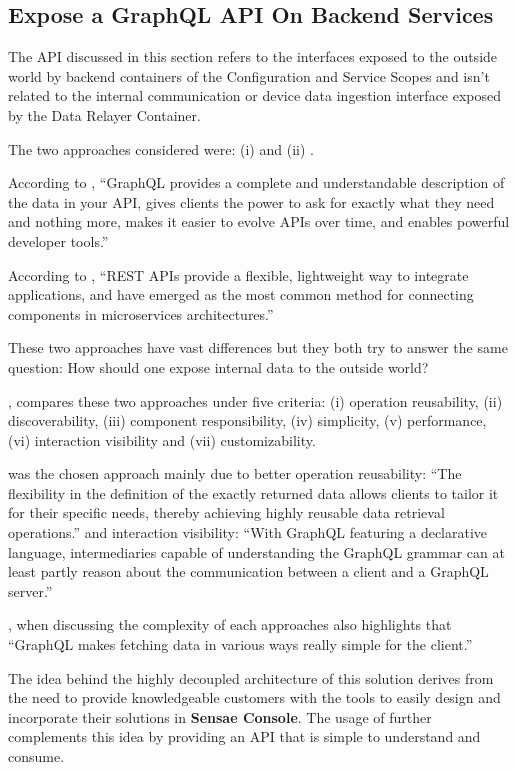 \subsection{Expose a GraphQL API On Backend Services}
\label{subsec:implementation:decisions:graphql}

The \gls{API} discussed in this section refers to the interfaces exposed to the outside world by backend containers of the Configuration and Service Scopes and isn't related to the internal communication or device data ingestion interface exposed by the Data Relayer Container.

The two approaches considered were: (i)  and (ii) .

According to \cite{graphql}, ``GraphQL provides a complete and understandable description of the data in your API, gives clients the power to ask for exactly what they need and nothing more, makes it easier to evolve APIs over time, and enables powerful developer tools.''

According to \cite{rest}, ``REST APIs provide a flexible, lightweight way to integrate applications, and have emerged as the most common method for connecting components in microservices architectures.''
 
These two approaches have vast differences but they both try to answer the same question: How should one expose internal data to the outside world?

\cite{eizinger2017api}, compares these two approaches under five criteria: (i) operation reusability, (ii) discoverability, (iii) component responsibility, (iv) simplicity, (v) performance, (vi) interaction visibility and (vii) customizability.

 was the chosen approach mainly due to better operation reusability: ``The flexibility in the definition of the exactly returned data allows clients to tailor it for their specific needs, thereby achieving highly reusable data retrieval operations.'' and interaction visibility: ``With GraphQL featuring a declarative language, intermediaries capable of understanding the GraphQL grammar can at least partly reason about the communication between a client and a GraphQL server.''

\cite{eizinger2017api}, when discussing the complexity of each approaches also highlights that ``GraphQL makes fetching data in various ways really simple for the client.''

The idea behind the highly decoupled architecture of this solution derives from the need to provide knowledgeable customers with the tools to easily design and incorporate their solutions in \textbf{Sensae Console}. The usage of  further complements this idea by providing an API that is simple to understand and consume.

